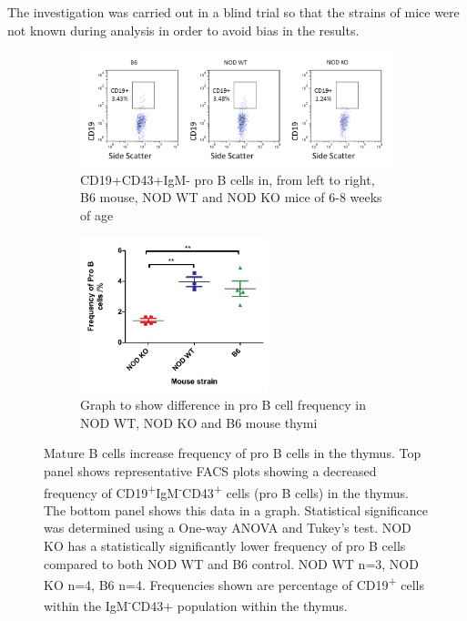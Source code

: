 The investigation was carried out in a blind trial so that the strains of mice were not known during analysis in order to avoid bias in the results.

\begin{figure}
	\begin{subfigure}{\textwidth}
	\includegraphics[width=\textwidth]{Figures/MatureBincproB.png}
	\caption{CD19+CD43+IgM- pro B cells in, from left to right, B6 mouse, NOD WT and NOD KO mice of 6-8 weeks of age}
	\end{subfigure}
	\begin{subfigure}{\textwidth}
	\centering
	\includegraphics[width=0.6\textwidth]{Figures/MatureBincproBgraph.pdf}
	\caption{Graph to show difference in pro B cell frequency in NOD WT, NOD KO and B6 mouse thymi}
	\label{subfig:MatureBincproBgraph}
	\end{subfigure}
\caption{Mature B cells increase frequency of pro B cells in the thymus.
Top panel shows representative FACS plots showing a decreased frequency of CD19\textsuperscript{+}IgM\textsuperscript{-}CD43\textsuperscript{+} cells (pro B cells) in the thymus.
The bottom panel shows this data in a graph.
Statistical significance was determined using a One-way ANOVA and Tukey's test. NOD KO has a statistically significantly lower frequency of pro B cells compared to both NOD WT and B6 control. NOD WT n=3, NOD KO n=4, B6 n=4. Frequencies shown are percentage of CD19\textsuperscript{+} cells within the IgM\textsuperscript{-}CD43{+} population within the thymus.}
\label{fig:MatureBincProB}
\end{figure}


